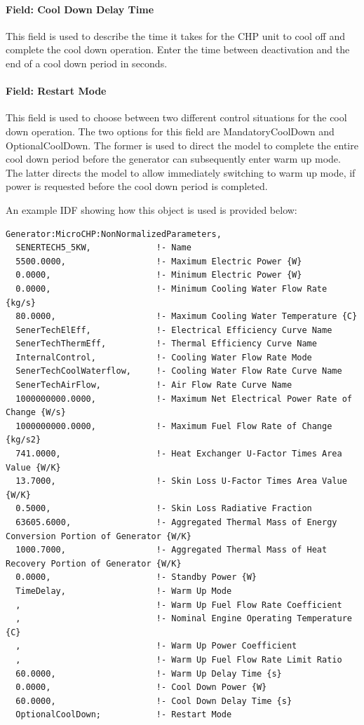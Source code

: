 \paragraph{Field: Cool Down Delay Time}\label{field-cool-down-delay-time}

This field is used to describe the time it takes for the CHP unit to cool off and complete the cool down operation. Enter the time between deactivation and the end of a cool down period in seconds.

\paragraph{Field: Restart Mode}\label{field-restart-mode}

This field is used to choose between two different control situations for the cool down operation. The two options for this field are MandatoryCoolDown and OptionalCoolDown. The former is used to direct the model to complete the entire cool down period before the generator can subsequently enter warm up mode. The latter directs the model to allow immediately switching to warm up mode, if power is requested before the cool down period is completed.

An example IDF showing how this object is used is provided below:

\begin{lstlisting}
Generator:MicroCHP:NonNormalizedParameters,
  SENERTECH5_5KW,             !- Name
  5500.0000,                  !- Maximum Electric Power {W}
  0.0000,                     !- Minimum Electric Power {W}
  0.0000,                     !- Minimum Cooling Water Flow Rate {kg/s}
  80.0000,                    !- Maximum Cooling Water Temperature {C}
  SenerTechElEff,             !- Electrical Efficiency Curve Name
  SenerTechThermEff,          !- Thermal Efficiency Curve Name
  InternalControl,            !- Cooling Water Flow Rate Mode
  SenerTechCoolWaterflow,     !- Cooling Water Flow Rate Curve Name
  SenerTechAirFlow,           !- Air Flow Rate Curve Name
  1000000000.0000,            !- Maximum Net Electrical Power Rate of Change {W/s}
  1000000000.0000,            !- Maximum Fuel Flow Rate of Change {kg/s2}
  741.0000,                   !- Heat Exchanger U-Factor Times Area Value {W/K}
  13.7000,                    !- Skin Loss U-Factor Times Area Value {W/K}
  0.5000,                     !- Skin Loss Radiative Fraction
  63605.6000,                 !- Aggregated Thermal Mass of Energy Conversion Portion of Generator {W/K}
  1000.7000,                  !- Aggregated Thermal Mass of Heat Recovery Portion of Generator {W/K}
  0.0000,                     !- Standby Power {W}
  TimeDelay,                  !- Warm Up Mode
  ,                           !- Warm Up Fuel Flow Rate Coefficient
  ,                           !- Nominal Engine Operating Temperature {C}
  ,                           !- Warm Up Power Coefficient
  ,                           !- Warm Up Fuel Flow Rate Limit Ratio
  60.0000,                    !- Warm Up Delay Time {s}
  0.0000,                     !- Cool Down Power {W}
  60.0000,                    !- Cool Down Delay Time {s}
  OptionalCoolDown;           !- Restart Mode
\end{lstlisting}

